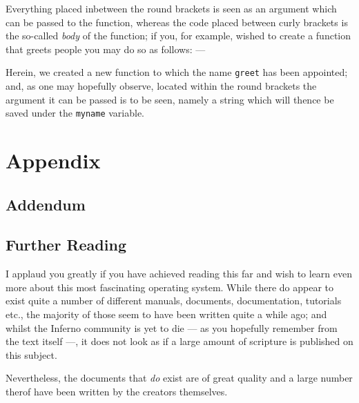 \documentclass[a5paper,twoside,12pt]{report}
\begin{document}
Everything placed inbetween the round brackets is seen as an argument which can be passed to the function, whereas the code placed between curly brackets is the so-called \textit{body} of the function; if you, for example, wished to create a function that greets people you may do so as follows: —



Herein, we created a new function to which the name \texttt{greet} has been appointed; and, as one may hopefully observe, located within the round brackets the argument it can be passed is to be seen, namely a string which will thence be saved under the \texttt{myname} variable.

\newpage

\part*{Appendix}
  \newpage

\thispagestyle{empty}
  \mbox{}
  \newpage

\chapter*{Addendum}

\newpage

\chapter*{Further Reading}

I applaud you greatly if you have achieved reading this far and wish to learn even more about this most fascinating operating system. While there do appear to exist quite a number of different manuals, documents, documentation, tutorials etc., the majority of those seem to have been written quite a while ago; and whilst the Inferno community is yet to die — as you hopefully remember from the text itself —, it does not look as if a large amount of scripture is published on this subject. 

Nevertheless, the documents that \textit{do} exist are of great quality and a large number therof have been written by the creators themselves. 
\end{document}
